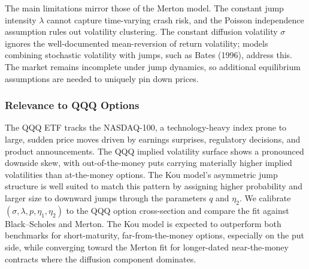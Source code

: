 \documentclass[12pt]{article}
\begin{document}
The main limitations mirror those of the Merton model. The constant jump intensity
$\lambda$ cannot capture time-varying crash risk, and the Poisson independence assumption
rules out volatility clustering. The constant diffusion volatility $\sigma$ ignores the
well-documented mean-reversion of return volatility; models combining stochastic
volatility with jumps, such as Bates (1996), address this. The market remains incomplete
under jump dynamics, so additional equilibrium assumptions are needed to uniquely pin
down prices.

\subsubsection*{Relevance to QQQ Options}

The QQQ ETF tracks the NASDAQ-100, a technology-heavy index prone to large, sudden
price moves driven by earnings surprises, regulatory decisions, and product announcements.
The QQQ implied volatility surface shows a pronounced downside skew, with
out-of-the-money puts carrying materially higher implied volatilities than at-the-money
options. The Kou model's asymmetric jump structure is well suited to match this pattern
by assigning higher probability and larger size to downward jumps through the parameters
$q$ and $\eta_2$. We calibrate $(\sigma, \lambda, p, \eta_1, \eta_2)$ to the QQQ option
cross-section and compare the fit against Black--Scholes and Merton. The Kou model is
expected to outperform both benchmarks for short-maturity, far-from-the-money options, especially on the put side, while converging toward the Merton fit for longer-dated near-the-money contracts where the diffusion component dominates.
\end{document}
